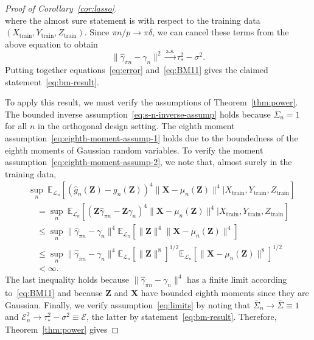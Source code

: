 \documentclass[12pt]{article}
\theoremstyle{definition}
\theoremstyle{remark}
\newcommand{\prx}{\bm X}
\newcommand{\srx}{X}
\newcommand{\prz}{\bm Z}
\newcommand{\srz}{Z}
\newcommand{\sry}{Y}
\begin{document}
\begin{proof}[Proof of Corollary~\ref{cor:lasso}]
\begin{equation}
\end{equation}
where the almost sure statement is with respect to the training data $(\srx_{\text{train}}, \sry_{\text{train}}, \srz_{\text{train}})$. Since $\pi n/p \rightarrow \pi \delta$, we can cancel these terms from the above equation to obtain
\begin{equation}
	\|\widehat \gamma_{\pi n} - \gamma_n\|^2 \overset{\text{a.s.}}\rightarrow \tau_*^2 - \sigma^2.
	\label{eq:BM11}
\end{equation}
Putting together equations~\eqref{eq:error} and~\eqref{eq:BM11} gives the claimed statement~\eqref{eq:bm-result}. 

To apply this result, we must verify the assumptions of Theorem~\ref{thm:power}. The bounded inverse assumption~\eqref{eq:s-n-inverse-assump} holds because $\overline \Sigma_n = 1$ for all $n$ in the orthogonal design setting. The eighth moment assumption~\eqref{eq:eighth-moment-assump-1} holds due to the boundedness of the eighth moments of Gaussian random variables. To verify the moment assumption~\eqref{eq:eighth-moment-assump-2}, we note that, almost surely in the training data,
\begin{equation*}
\begin{split}
&\sup_n\ \mathbb E_{\mathcal L_n}[(\widehat g_n(\prz)-g_n(\prz))^4\|\prx - \mu_n(\prz)\|^4|\srx_{\text{train}}, \sry_{\text{train}}, \srz_{\text{train}}] \\
&\quad= \sup_n\ \mathbb E_{\mathcal L_n}[(\prz \widehat \gamma_{\pi n} - \prz \gamma_n)^4\|\prx - \mu_n(\prz)\|^4|\srx_{\text{train}}, \sry_{\text{train}}, \srz_{\text{train}}] \\
&\quad\leq \sup_n\|\widehat \gamma_{\pi n} - \gamma_n\|^4  \mathbb E_{\mathcal L_n}[\|\prz\|^4\|\prx - \mu_n(\prz)\|^4] \\
&\quad\leq \sup_n\|\widehat \gamma_{\pi n} - \gamma_n\|^4  \mathbb E_{\mathcal L_n}[\|\prz\|^8]^{1/2} \mathbb E_{\mathcal L_n}[\|\prx - \mu_n(\prz)\|^8]^{1/2} \\
&\quad < \infty.
\end{split}
\end{equation*}
The last inequality holds because $\|\widehat \gamma_{\pi n} - \gamma_n\|^4$ has a finite limit according to~\eqref{eq:BM11} and because $\prz$ and $\prx$ have bounded eighth moments since they are Gaussian. Finally, we verify assumption~\eqref{eq:limits} by noting that $\overline \Sigma_n\rightarrow \overline \Sigma \equiv 1$ and $\mathcal E_n^2 \rightarrow \tau_*^2 - \sigma^2 \equiv \mathcal E$, the latter by statement~\eqref{eq:bm-result}. Therefore, Theorem~\ref{thm:power} gives 

\end{proof}
\end{document}
